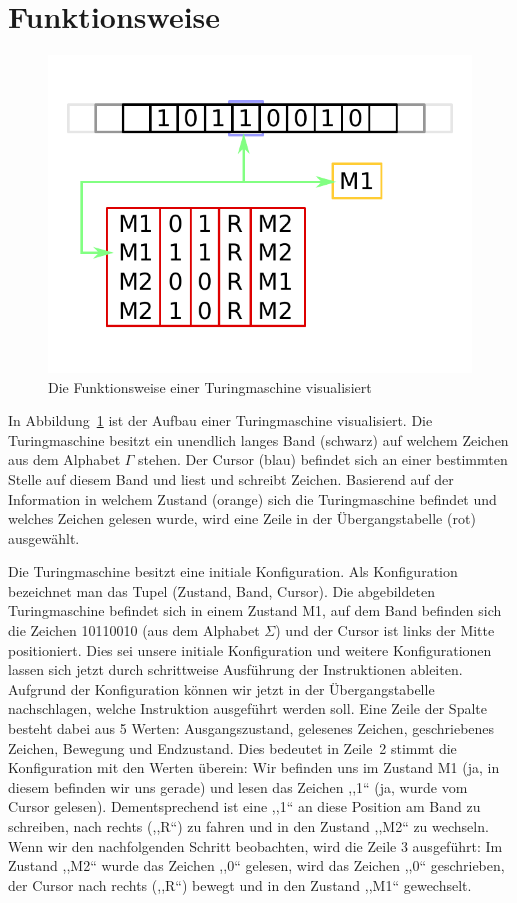 \section{Funktionsweise}
%
\begin{figure}[h]
 \begin{center}
  \includegraphics{img/turingmachine_visualization.pdf}
  \caption{Die Funktionsweise einer Turingmaschine visualisiert}
  \label{fig:tm_vis}
 \end{center}
\end{figure}
%
In Abbildung~\ref{fig:tm_vis} ist der Aufbau einer Turingmaschine visualisiert. Die Turingmaschine besitzt ein unendlich langes Band (schwarz) auf welchem Zeichen aus dem Alphabet $\Gamma$ stehen. Der Cursor (blau) befindet sich an einer bestimmten Stelle auf diesem Band und liest und schreibt Zeichen. Basierend auf der Information in welchem Zustand (orange) sich die Turingmaschine befindet und welches Zeichen gelesen wurde, wird eine Zeile in der Übergangstabelle (rot) ausgewählt.

Die Turingmaschine besitzt eine initiale Konfiguration. Als Konfiguration bezeichnet man das Tupel (Zustand, Band, Cursor). Die abgebildeten Turingmaschine befindet sich in einem Zustand M1, auf dem Band befinden sich die Zeichen 10110010 (aus dem Alphabet $\Sigma$) und der Cursor ist links der Mitte positioniert. Dies sei unsere initiale Konfiguration und weitere Konfigurationen lassen sich jetzt durch schrittweise Ausführung der Instruktionen ableiten. \\
Aufgrund der Konfiguration können wir jetzt in der Übergangstabelle nachschlagen, welche Instruktion ausgeführt werden soll. Eine Zeile der Spalte besteht dabei aus 5 Werten: Ausgangszustand, gelesenes Zeichen, geschriebenes Zeichen, Bewegung und Endzustand. Dies bedeutet in Zeile~2 stimmt die Konfiguration mit den Werten überein: Wir befinden uns im Zustand M1 (ja, in diesem befinden wir uns gerade) und lesen das Zeichen ,,1`` (ja, wurde vom Cursor gelesen). Dementsprechend ist eine ,,1`` an diese Position am Band zu schreiben, nach rechts (,,R``) zu fahren und in den Zustand ,,M2`` zu wechseln. Wenn wir den nachfolgenden Schritt beobachten, wird die Zeile 3 ausgeführt: Im Zustand ,,M2`` wurde das Zeichen ,,0`` gelesen, wird das Zeichen ,,0`` geschrieben, der Cursor nach rechts (,,R``) bewegt und in den Zustand ,,M1`` gewechselt.

